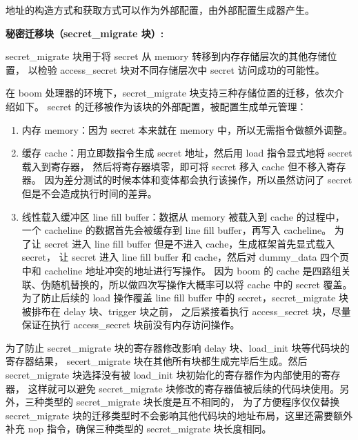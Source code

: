 地址的构造方式和获取方式可以作为外部配置，由外部配置生成器产生。\par

\textbf{秘密迁移块（secret\_migrate 块）:}\par
secret\_migrate 块用于将 secret 从 memory 转移到内存存储层次的其他存储位置，
以检验 access\_secret 块对不同存储层次中 secret 访问成功的可能性。\par

在 boom 处理器的环境下，secret\_migrate 块支持三种存储位置的迁移，依次介绍如下。
secret 的迁移被作为该块的外部配置，被配置生成单元管理：
\begin{enumerate}
    \item 内存 memory：因为 secret 本来就在 memory 中，所以无需指令做额外调整。\par
    \item 缓存 cache：用立即数指令生成 secret 地址，然后用 load 指令显式地将 secret 载入到寄存器，
然后将寄存器填零，即可将 secret 移入 cache 但不移入寄存器。
因为差分测试的时候本体和变体都会执行该操作，所以虽然访问了 secret 但是不会造成执行时间的差异。\par
    \item 线性载入缓冲区 line fill buffer：数据从 memory 被载入到 cache 的过程中，
    一个 cacheline 的数据首先会被缓存到 line fill buffer，再写入 cacheline。
    为了让 secret 进入 line fill buffer 但是不进入 cache，生成框架首先显式载入 secret，
    让 secret 进入 line fill buffer 和 cache，然后对 dummy\_data 四个页中和 cacheline 地址冲突的地址进行写操作。
    因为 boom 的 cache 是四路组关联、伪随机替换的，所以做四次写操作大概率可以将 cache 中的 secret 覆盖。
    为了防止后续的 load 操作覆盖 line fill buffer 中的 secret，secret\_migrate 块被排布在 delay 块、trigger 块之前，
    之后紧接着执行 access\_secret 块，尽量保证在执行 access\_secret 块前没有内存访问操作。\par
\end{enumerate}

为了防止 secret\_migrate 块的寄存器修改影响 delay 块、load\_init 块等代码块的寄存器结果，
secert\_migrate 块在其他所有块都生成完毕后生成。然后 secret\_migrate 块选择没有被 load\_init 块初始化的寄存器作为内部使用的寄存器，
这样就可以避免 secret\_migrate 块修改的寄存器值被后续的代码块使用。另外，三种类型的 secret\_migrate 块长度是互不相同的，
为了方便程序仅仅替换 secret\_migrate 块的迁移类型时不会影响其他代码块的地址布局，这里还需要额外补充 nop 指令，确保三种类型的 secret\_migrate 块长度相同。\par

